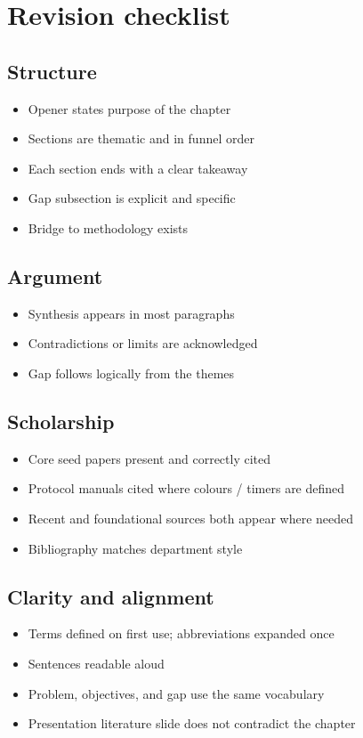 \documentclass[11pt,a4paper]{article}
\begin{document}
\section{Revision checklist}

\subsection{Structure}
\begin{itemize}[label=$\square$]
  \item Opener states purpose of the chapter
  \item Sections are thematic and in funnel order
  \item Each section ends with a clear takeaway
  \item Gap subsection is explicit and specific
  \item Bridge to methodology exists
\end{itemize}

\subsection{Argument}
\begin{itemize}[label=$\square$]
  \item Synthesis appears in most paragraphs
  \item Contradictions or limits are acknowledged
  \item Gap follows logically from the themes
\end{itemize}

\subsection{Scholarship}
\begin{itemize}[label=$\square$]
  \item Core seed papers present and correctly cited
  \item Protocol manuals cited where colours / timers are defined
  \item Recent and foundational sources both appear where needed
  \item Bibliography matches department style
\end{itemize}

\subsection{Clarity and alignment}
\begin{itemize}[label=$\square$]
  \item Terms defined on first use; abbreviations expanded once
  \item Sentences readable aloud
  \item Problem, objectives, and gap use the same vocabulary
  \item Presentation literature slide does not contradict the chapter
\end{itemize}
\end{document}
